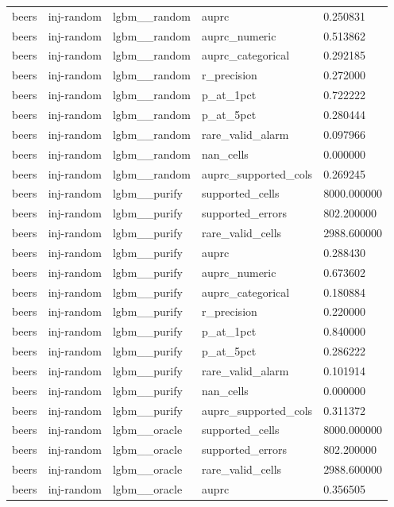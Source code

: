 \begin{tabular}{lllll}
beers & inj-random & lgbm\_\_random & auprc & 0.250831 \\
beers & inj-random & lgbm\_\_random & auprc\_numeric & 0.513862 \\
beers & inj-random & lgbm\_\_random & auprc\_categorical & 0.292185 \\
beers & inj-random & lgbm\_\_random & r\_precision & 0.272000 \\
beers & inj-random & lgbm\_\_random & p\_at\_1pct & 0.722222 \\
beers & inj-random & lgbm\_\_random & p\_at\_5pct & 0.280444 \\
beers & inj-random & lgbm\_\_random & rare\_valid\_alarm & 0.097966 \\
beers & inj-random & lgbm\_\_random & nan\_cells & 0.000000 \\
beers & inj-random & lgbm\_\_random & auprc\_supported\_cols & 0.269245 \\
beers & inj-random & lgbm\_\_purify & supported\_cells & 8000.000000 \\
beers & inj-random & lgbm\_\_purify & supported\_errors & 802.200000 \\
beers & inj-random & lgbm\_\_purify & rare\_valid\_cells & 2988.600000 \\
beers & inj-random & lgbm\_\_purify & auprc & 0.288430 \\
beers & inj-random & lgbm\_\_purify & auprc\_numeric & 0.673602 \\
beers & inj-random & lgbm\_\_purify & auprc\_categorical & 0.180884 \\
beers & inj-random & lgbm\_\_purify & r\_precision & 0.220000 \\
beers & inj-random & lgbm\_\_purify & p\_at\_1pct & 0.840000 \\
beers & inj-random & lgbm\_\_purify & p\_at\_5pct & 0.286222 \\
beers & inj-random & lgbm\_\_purify & rare\_valid\_alarm & 0.101914 \\
beers & inj-random & lgbm\_\_purify & nan\_cells & 0.000000 \\
beers & inj-random & lgbm\_\_purify & auprc\_supported\_cols & 0.311372 \\
beers & inj-random & lgbm\_\_oracle & supported\_cells & 8000.000000 \\
beers & inj-random & lgbm\_\_oracle & supported\_errors & 802.200000 \\
beers & inj-random & lgbm\_\_oracle & rare\_valid\_cells & 2988.600000 \\
beers & inj-random & lgbm\_\_oracle & auprc & 0.356505 \\

\end{tabular}
